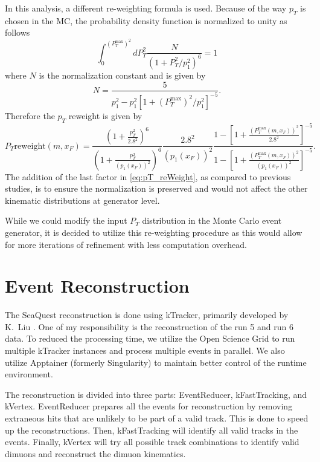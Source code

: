 \documentclass[../main.tex]{subfiles}
\begin{document}
In this analysis, a different re-weighting formula is used. Because of the way $p_T$ is chosen
in the MC, the probability density function is normalized to unity as follows
\begin{equation}
	\int^{\left(P_T^{\mathrm{max}}\right)^2}_0 dP_T^2 \frac{N}{\left(1+ P_T^2/p_1^2\right)^6}=1
\end{equation}
where $N$ is the normalization constant and is given by
\begin{equation}
	N=\frac{5}{p_1^2-p_1^2\left[ 1+ \left(P_T^{\mathrm{max}}\right)^2/p_1^2\right]^{-5}}.
\end{equation}
Therefore the $p_T$ reweight is given by
\begin{equation}
	P_T \mathrm{ reweight}\left(m,x_F\right)=
	\frac{\left(1 + \frac{p_T^2}{2.8^2} \right)^6}{\left(1 + \frac{p_T^2}{\left(p_1\left(x_F\right)\right)^2} \right)^6} \frac{2.8^2}{\left(p_1\left(x_F\right)\right)^2}\frac{1-\left[ 1+ \frac{\left(P_T^{\mathrm{max}}\left(m,x_F\right)\right)^2}{2.8^2}\right]^{-5}}{1-\left[ 1+ \frac{\left(P_T^{\mathrm{max}}\left(m,x_F\right)\right)^2}{\left(p_1\left(x_F\right)\right)^2}\right]^{-5}}.
	\label{eq:pT_reWeight}
\end{equation}
The addition of the last factor in \cref{eq:pT_reWeight}, as compared to previous studies,
is to ensure the normalization is preserved and would not affect the other kinematic
distributions at generator level.

While we could modify the input $P_T$ distribution in the Monte Carlo event generator,
it is decided to utilize this re-weighting procedure as this would allow for
more iterations of refinement with less computation overhead.

\section{Event Reconstruction}
The SeaQuest reconstruction is done using kTracker, primarily developed by K.~Liu \cite{kTracker}.
One of my responsibility is the reconstruction of the run 5 and run 6 data. To reduced the processing
time, we utilize the Open Science Grid \cite{ruthpordes2007,sfiligoi2009,OSGPool} to run multiple kTracker
instances and process multiple events in parallel.
We also utilize Apptainer (formerly Singularity)\cite{kurtzer2021} to maintain better control of the
runtime environment.

The reconstruction is divided into three parts: EventReducer, kFastTracking, and kVertex.
EventReducer prepares all the events for reconstruction by removing extraneous hits that are
unlikely to be part of a valid track. This is done to speed up the reconstructions. Then, kFastTracking
will identify all valid tracks in the events. Finally, kVertex will try all possible track combinations
to identify valid dimuons and reconstruct the dimuon kinematics.
\end{document}
